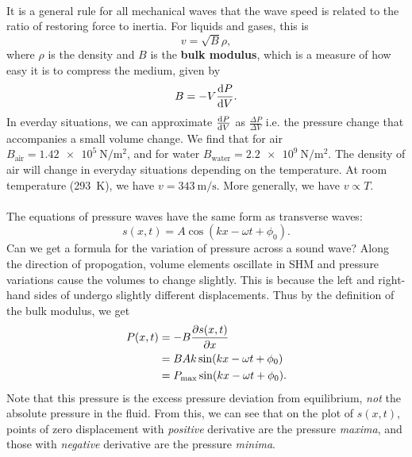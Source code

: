 \documentclass[../classical_mechanics.tex]{subfiles}
\begin{document}
        \paragraph{}
        It is a general rule for all mechanical waves that the wave speed is related to the ratio of restoring force to inertia.
        For liquids and gases, this is
        \begin{equation}
            v=\sqrt{B}{\rho},
        \end{equation}
        where $\rho$ is the density and $B$ is the \textbf{bulk modulus}, which is a measure of how easy it is to compress the medium, given by
        \begin{equation}
            B=-V\dv{P}{V}.
        \end{equation}
        In everday situations, we can approximate $\dv{P}{V}$ as $\frac{\Delta P}{\Delta V}$ i.e. the pressure change that accompanies a small volume change.
        We find that for air $B_\text{air}=\qty{1.42e5}{\newton\per\meter\squared}$, and for water $B_\text{water}=\qty{2.2e9}{\newton\per\meter\squared}$.
        The density of air will change in everyday situations depending on the temperature.
        At room temperature (\qty{293}{\kelvin}), we have $v=\qty{343}{\meter\per\second}$.
        More generally, we have $v\propto T$.

        \paragraph{}
        The equations of pressure waves have the same form as transverse waves:
        \begin{equation}
            s(x,t)=A\cos(kx-\omega t+\phi_0).
        \end{equation}
        Can we get a formula for the variation of pressure across a sound wave?
        Along the direction of propogation, volume elements oscillate in SHM and pressure variations cause the volumes to change slightly.
        This is because the left and right-hand sides of undergo slightly different displacements.
        Thus by the definition of the bulk modulus, we get
        \begin{align}
            P(x,t)&=-B\pdv{s(x,t)}{x}\\
            &=BAk\sin(kx-\omega t+\phi_0)\\
            &=P_\text{max}\sin(kx-\omega t+\phi_0).
        \end{align}
        Note that this pressure is the excess pressure deviation from equilibrium, \textit{not} the absolute pressure in the fluid.
        From this, we can see that on the plot of $s(x,t)$, points of zero displacement with \textit{positive} derivative are the pressure \textit{maxima}, and those with \textit{negative} derivative are the pressure \textit{minima}.
\end{document}
